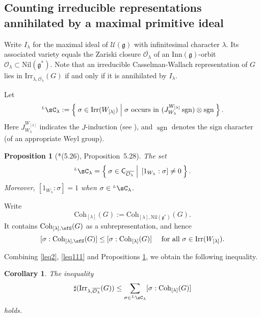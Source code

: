 \documentclass[12pt,a4paper]{amsart}
\newcommand{\CO}{{\mathcal {O}}}
\newcommand{\sgn}{\operatorname{sgn}}
\newcommand{\g}{\mathfrak g}
\numberwithin{equation}{section}
\newtheorem{prop}[thm]{Proposition}
\newtheorem{cor}[thm]{Corollary}
\theoremstyle{remark}
\def\Irr{\mathrm{Irr}}
\def\LC{{}^{\scriptscriptstyle L}\sC}
\def\Coh{\mathrm{Coh}}
\newcommand{\Lam}{{[\lambda]}}
\begin{document}
\subsection{Counting irreducible representations annihilated by a maximal primitive ideal}\label{sec13}
Write $I_\lambda$ for the maximal ideal of $\mathcal U(\g)$ with infinitesimal
character $\lambda$. Its associated variety equals the Zariski closure
$\overline{\CO_\lambda}$ of an $\mathrm{Inn}(\g)$-orbit
$\CO_\lambda\subset\mathrm{Nil}(\g^*) $. Note that an irreducible
Casselman-Wallach representation of $G$ lies in
$\Irr_{\lambda,\overline{\CO_\lambda}}(G)$ if and only if it is annihilated by
$I_\lambda$.


Let
\[
  \LC_{\lambda}:= \Set{\sigma\in \Irr(W_\Lam) | \sigma \text{ occurs in $(J_{W_{\lambda}}^{W_{\Lam}} \sgn )\otimes \sgn$}}.
\]
Here $J_{W_{\lambda}}^{W_{\Lam}} $ indicates the $J$-induction (see \cite[Chapter 12]{Carter}), and $\sgn$
denotes the sign character (of an appropriate Weyl group).




 \begin{prop}[{\cite{BVUni}*{(5.26), Proposition~5.28}}]\label{lem:lcell.BV0}
  The set
   \[
     \LC_{\lambda} = \Set{\sigma\in \mathsf C_{\overline{\CO_\lambda}} |\,   [1_{W_{\lambda}}:\sigma]\neq 0}.
   \]
   Moreover, $[1_{W_{\lambda}}:\sigma]=1$ when
   $\sigma\in \LC_\lambda$.
 \end{prop}

Write
\[
  \Coh_{\Lam}(G):= \Coh_{\Lam,\mathrm{Nil}(\g^*)}(G).
\]
It contains $ \Coh_{\Lam,\sfS}(G)$ as a subrepresentation, and hence
\begin{equation}\label{leq111}
  [\sigma: \Coh_{\Lam,\sfS}(G)]\leq [\sigma: \Coh_{\Lam}(G)]\quad \textrm{ for all $\sigma\in \Irr(W_\Lam)$.}
\end{equation}

 Combining \eqref{leq2}, \eqref{leq111} and  Propositions \ref{lem:lcell.BV0}, we obtain the following inequality.

 \begin{cor}
   The inequality
   \begin{equation}\label{boundc}
     \sharp(\Irr_{\lambda,\overline{\CO_\lambda}}(G)) \leq \sum_{\sigma\in \LC_\lambda} [\sigma: \Coh_{\Lam}(G)]
   \end{equation}
   holds.
 \end{cor}
\end{document}
